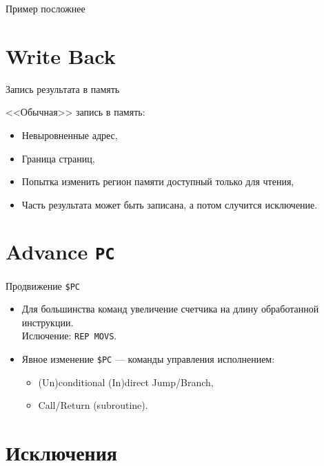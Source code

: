 \documentclass{beamer}
\begin{document}
\begin{frame}{Пример посложнее}


\end{frame}

\section{Write Back}

\begin{frame}{Запись результата в память}

<<Обычная>> запись в память:

\pause

\begin{itemize}
    \item Невыровненные адрес,
    \item Граница страниц,
    \item Попытка изменить регион памяти доступный только для чтения,
    \item Часть результата может быть записана, а потом случится исключение.
\end{itemize}

\end{frame}

\section{Advance \texttt{PC}}

\begin{frame}{Продвижение \texttt{\$PC}}

\begin{itemize}
    \item Для большинства команд увеличение счетчика на длину обработанной инструкции. \\
    Ислючение: \texttt{REP MOVS}.
    \pause\bigskip
    \item Явное изменение \texttt{\$PC} — команды управления исполнением:
    \begin{itemize}
        \item (Un)conditional (In)direct Jump/Branch,
        \item Call/Return (subroutine).
    \end{itemize}
\end{itemize}

\end{frame}


\section{Исключения}
\end{document}
